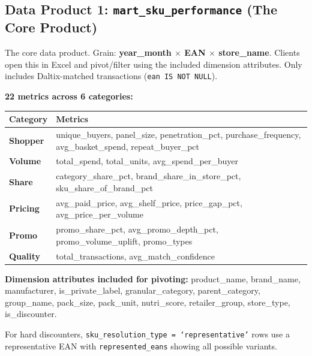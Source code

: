 \documentclass[11pt,a4paper]{article}
\begin{document}
\subsection{Data Product 1: \texttt{mart\_sku\_performance} (The Core Product)}

\begin{categorybox}
The core data product. Grain: \textbf{year\_month $\times$ EAN $\times$ store\_name}. Clients open this in Excel and pivot/filter using the included dimension attributes. Only includes Daltix-matched transactions (\texttt{ean IS NOT NULL}).

\vspace{0.5em}
\textbf{22 metrics across 6 categories:}

\vspace{0.5em}
\renewcommand{\arraystretch}{1.3}
\begin{tabularx}{\textwidth}{L{2.5cm} L{10.5cm}}
\toprule
{}
\textbf{\color{white}Category} & \textbf{\color{white}Metrics} \\
\midrule
\textbf{Shopper} & unique\_buyers, panel\_size, penetration\_pct, purchase\_frequency, avg\_basket\_spend, repeat\_buyer\_pct \\
\textbf{Volume} & total\_spend, total\_units, avg\_spend\_per\_buyer \\
\textbf{Share} & category\_share\_pct, brand\_share\_in\_store\_pct, sku\_share\_of\_brand\_pct \\
\textbf{Pricing} & avg\_paid\_price, avg\_shelf\_price, price\_gap\_pct, avg\_price\_per\_volume \\
\textbf{Promo} & promo\_share\_pct, avg\_promo\_depth\_pct, promo\_volume\_uplift, promo\_types \\
\textbf{Quality} & total\_transactions, avg\_match\_confidence \\
\bottomrule
\end{tabularx}

\vspace{0.5em}
\textbf{Dimension attributes included for pivoting:} product\_name, brand\_name, manufacturer, is\_private\_label, granular\_category, parent\_category, group\_name, pack\_size, pack\_unit, nutri\_score, retailer\_group, store\_type, is\_discounter.

\vspace{0.3em}
{\small\color{milogray} For hard discounters, \texttt{sku\_resolution\_type = `representative'} rows use a representative EAN with \texttt{represented\_eans} showing all possible variants.}
\end{categorybox}
\end{document}
